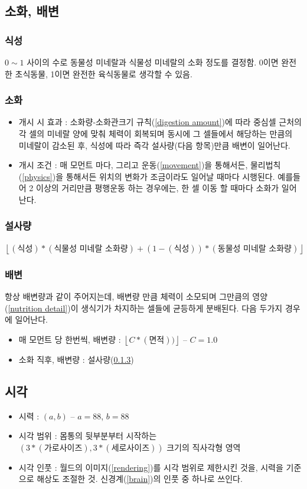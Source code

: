 \documentclass[a4paper,12pt]{article}
\newcommand{\floor}[1]{\left\lfloor{#1}\right\rfloor}
\begin{document}
\subsection{소화, 배변}
\subsubsection{식성}\label{taste}
$0\sim 1$ 사이의 수로 동물성 미네랄과 식물성 미네랄의 소화 정도를 결정함. 0이면 완전한 초식동물, 1이면 완전한 육식동물로 생각할 수 있음.
\subsubsection{소화}\label{digestion}
\begin{itemize}
\item 개시 시 효과 : 소화량-소화관크기 규칙(\ref{digestion amount})에 따라 중심셀 근처의 각 셀의 미네랄 양에 맞춰 체력이 회복되며 동시에 그 셀들에서 해당하는 만큼의 미네랄이 감소된 후, 식성에 따라 즉각 설사량(다음 항목)만큼 배변이 일어난다. 
\item 개시 조건 : 매 모먼트 마다, 그리고 운동(\ref{movement})을 통해서든, 물리법칙(\ref{physics})을 통해서든 위치의 변화가 조금이라도 일어날 때마다 시행된다. 예를들어 2 이상의 거리만큼 평행운동 하는 경우에는, 한 셀 이동 할 때마다 소화가 일어난다.   
\end{itemize}
\subsubsection{설사량}\label{diarrhea amount}
$\floor{(\text{식성})*(\text{식물성 미네랄 소화량})+(1-(\text{식성}))*(\text{동물성 미네랄 소화량})}$
\subsubsection{배변}\label{excretion}
항상 배변량과 같이 주어지는데, 배변량 만큼 체력이 소모되며 그만큼의 영양(\ref{nutrition detail})이 생식기가 차지하는 셀들에 균등하게 분배된다. 다음 두가지 경우에 일어난다. 
\begin{itemize}
\item 매 모먼트 당 한번씩, 배변량 : $\floor{C*(\text{면적}))}$ -- $C=1.0$
\item 소화 직후, 배변량 : 설사량(\ref{diarrhea amount})
\end{itemize} 

\subsection{시각}\label{visual input}
\begin{itemize} 
\item 시력 : $(a,b)$ -- $a=88$, $b=88$
\item 시각 범위 : 몸통의 뒷부분부터 시작하는 $(3*(\text{가로사이즈}),3*(\text{세로사이즈}))$ 크기의 직사각형 영역 
\item 시각 인풋 : 월드의 이미지(\ref{rendering})를 시각 범위로 제한시킨 것을, 시력을 기준으로 해상도 조절한 것. 신경계(\ref{brain})의 인풋 중 하나로 쓰인다. 
\end{itemize}
\end{document}
